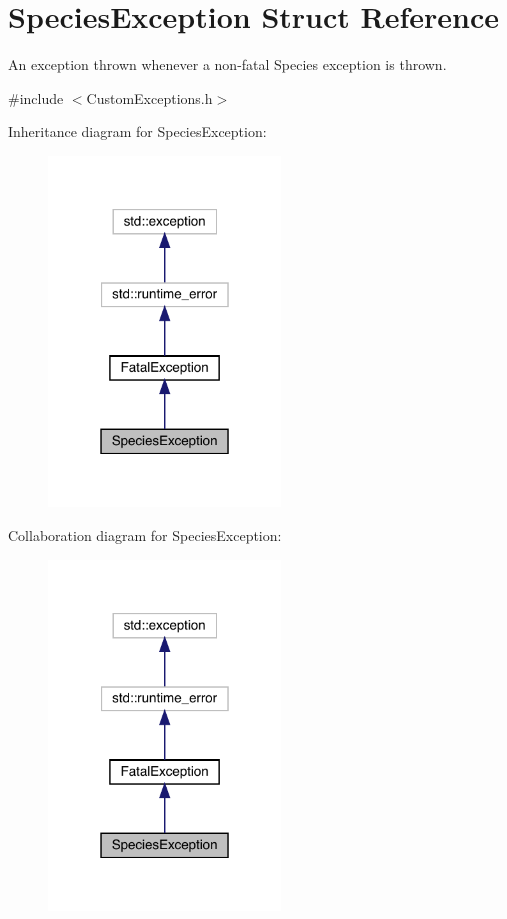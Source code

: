 \hypertarget{struct_species_exception}{}\section{Species\+Exception Struct Reference}
\label{struct_species_exception}


An exception thrown whenever a non-\/fatal Species exception is thrown.  




{\ttfamily \#include $<$Custom\+Exceptions.\+h$>$}



Inheritance diagram for Species\+Exception\+:
\nopagebreak
\begin{figure}[H]
\begin{center}
\leavevmode
\includegraphics[width=175pt]{struct_species_exception__inherit__graph}
\end{center}
\end{figure}


Collaboration diagram for Species\+Exception\+:
\nopagebreak
\begin{figure}[H]
\begin{center}
\leavevmode
\includegraphics[width=175pt]{struct_species_exception__coll__graph}
\end{center}
\end{figure}
